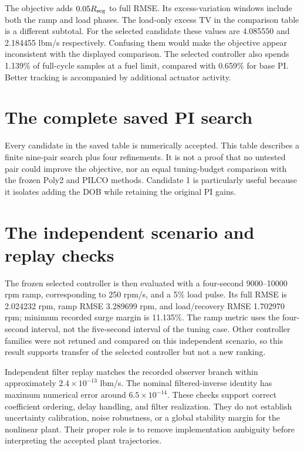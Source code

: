 The objective adds $0.05R_{\rm seg}$ to full RMSE. Its excess-variation windows include both the ramp and load phases. The load-only excess TV in the comparison table is a different subtotal. For the selected candidate these values are 4.085550 and 2.184455 lbm/s respectively. Confusing them would make the objective appear inconsistent with the displayed comparison. The selected controller also spends 1.139\% of full-cycle samples at a fuel limit, compared with 0.659\% for base PI. Better tracking is accompanied by additional actuator activity.

\section{The complete saved PI search}

Every candidate in the saved table is numerically accepted. This table describes a finite nine-pair search plus four refinements. It is not a proof that no untested pair could improve the objective, nor an equal tuning-budget comparison with the frozen Poly2 and PILCO methods. Candidate 1 is particularly useful because it isolates adding the DOB while retaining the original PI gains.

\section{The independent scenario and replay checks}
The frozen selected controller is then evaluated with a four-second 9000--10000 rpm ramp, corresponding to 250 rpm/s, and a 5\% load pulse. Its full RMSE is 2.024232 rpm, ramp RMSE 3.289699 rpm, and load/recovery RMSE 1.702970 rpm; minimum recorded surge margin is 11.135\%. The ramp metric uses the four-second interval, not the five-second interval of the tuning case. Other controller families were not retuned and compared on this independent scenario, so this result supports transfer of the selected controller but not a new ranking.

Independent filter replay matches the recorded observer branch within approximately $2.4\times10^{-13}$ lbm/s. The nominal filtered-inverse identity has maximum numerical error around $6.5\times10^{-14}$. These checks support correct coefficient ordering, delay handling, and filter realization. They do not establish uncertainty calibration, noise robustness, or a global stability margin for the nonlinear plant. Their proper role is to remove implementation ambiguity before interpreting the accepted plant trajectories.
